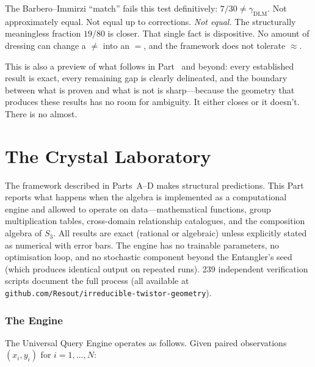 \documentclass[11pt,a4paper]{article}
\theoremstyle{definition}
\theoremstyle{remark}
\begin{document}
The Barbero--Immirzi ``match'' fails this test definitively: $7/30\neq\gamma_{\mathrm{DLM}}$. Not approximately equal. Not equal up to corrections. \emph{Not equal.} The structurally meaningless fraction $19/80$ is closer. That single fact is dispositive. No amount of dressing can change a $\neq$ into an $=$, and the framework does not tolerate $\approx$.

This is also a preview of what follows in Part~\ref{part:UQE} and beyond: every established result is exact, every remaining gap is clearly delineated, and the boundary between what is proven and what is not is sharp---because the geometry that produces these results has no room for ambiguity. It either closes or it doesn't. There is no almost.


\part{The Crystal Laboratory}\label{part:UQE}

The framework described in Parts~A--D makes structural predictions. This Part reports what happens when the algebra is implemented as a computational engine and allowed to operate on data---mathematical functions, group multiplication tables, cross-domain relationship catalogues, and the composition algebra of $S_3$. All results are exact (rational or algebraic) unless explicitly stated as numerical with error bars. The engine has no trainable parameters, no optimisation loop, and no stochastic component beyond the Entangler's seed (which produces identical output on repeated runs). 239 independent verification scripts document the full process (all available at \texttt{github.com/Resout/irreducible-twistor-geometry}).

\section{The Engine}\label{sec:engine}

The Universal Query Engine operates as follows. Given paired observations $(x_i, y_i)$ for $i=1,\ldots,N$:
\end{document}
